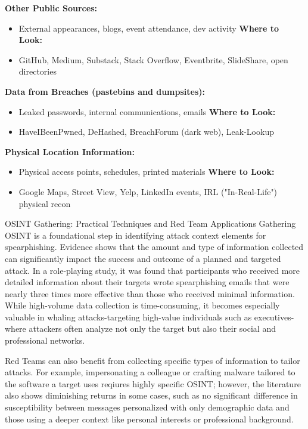 \textbf{Other Public Sources:}
\begin{itemize}
    \item External appearances, blogs, event attendance, dev activity
\textbf{Where to Look:}
\item GitHub, Medium, Substack, Stack Overflow, Eventbrite, SlideShare, open directories
    \end{itemize}

\textbf{Data from Breaches (pastebins and dumpsites):}
\begin{itemize}
    \item Leaked passwords, internal communications, emails
\textbf{Where to Look:}
\item HaveIBeenPwned, DeHashed, BreachForum (dark web), Leak-Lookup
    \end{itemize}

\textbf{Physical Location Information:}
\begin{itemize}
    \item Physical access points, schedules, printed materials
\textbf{Where to Look:}
\item Google Maps, Street View, Yelp, LinkedIn events, IRL ("In-Real-Life") physical recon
    \end{itemize}

OSINT Gathering: Practical Techniques and Red Team Applications
Gathering OSINT is a foundational step in identifying attack context elements for spearphishing. Evidence shows that the amount and type of information collected can significantly impact the success and outcome of a planned and targeted attack. In a role-playing study, it was found that participants who received more detailed information about their targets wrote spearphishing emails that were nearly three times more effective than those who received minimal information. While high-volume data collection is time-consuming, it becomes especially valuable in whaling attacks-targeting high-value individuals such as executives-where attackers often analyze not only the target but also their social and professional networks.

Red Teams can also benefit from collecting specific types of information to tailor attacks. For example, impersonating a colleague or crafting malware tailored to the software a target uses reqiures highly specific OSINT; however, the literature also shows diminishing returns in some cases, such as no significant difference in susceptibility between messages personalized with only demographic data and those using a deeper context like personal interests or professional background.

